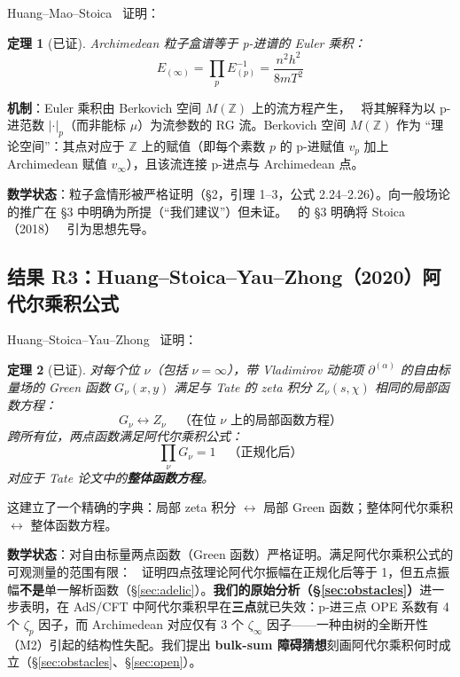 \documentclass[11pt,a4paper]{ctexart}
\newtheorem{theorem}{定理}[section]
\theoremstyle{remark}
\newcommand{\dpartial}{\partial^{(\alpha)}}
\begin{document}
Huang--Mao--Stoica~\cite{HMS20} 证明：

\begin{theorem}[已证]
Archimedean 粒子盒谱等于 p-进谱的 Euler 乘积：
\begin{equation}
E_{(\infty)} = \prod_p E_{(p)}^{-1} = \frac{n^2 h^2}{8 m T^2}
\end{equation}
\end{theorem}

\textbf{机制}：Euler 乘积由 Berkovich 空间 $M(\mathbb{Z})$ 上的流方程产生，~\cite{HMS20} 将其解释为以 p-进范数 $|\cdot|_p$（而非能标 $\mu$）为流参数的 RG 流。Berkovich 空间 $M(\mathbb{Z})$ 作为 ``理论空间''：其点对应于 $\mathbb{Z}$ 上的赋值（即每个素数 $p$ 的 p-进赋值 $v_p$ 加上 Archimedean 赋值 $v_\infty$），且该流连接 p-进点与 Archimedean 点。

\textbf{数学状态}：粒子盒情形被严格证明（\S2，引理 1--3，公式 2.24--2.26）。向一般场论的推广在 \S3 中明确为所提（``我们建议''）但未证。~\cite{HMS20} 的 \S3 明确将 Stoica（2018）~\cite{S18} 引为思想先导。

\subsection{结果 R3：Huang--Stoica--Yau--Zhong（2020）阿代尔乘积公式}
\label{sec:adelic-green}

Huang--Stoica--Yau--Zhong~\cite{HSYZ20} 证明：

\begin{theorem}[已证]
对每个位 $\nu$（包括 $\nu = \infty$），带 Vladimirov 动能项 $\dpartial$ 的自由标量场的 Green 函数 $G_\nu(x,y)$ 满足与 Tate 的 zeta 积分 $Z_\nu(s, \chi)$ 相同的局部函数方程：
\begin{equation}
G_\nu \leftrightarrow Z_\nu \quad \text{（在位 } \nu \text{ 上的局部函数方程）}
\end{equation}
跨所有位，两点函数满足阿代尔乘积公式：
\begin{equation}
\prod_\nu G_\nu = 1 \quad \text{（正规化后）}
\end{equation}
对应于 Tate 论文中的\textbf{整体函数方程}。
\end{theorem}

这建立了一个精确的字典：局部 zeta 积分 $\leftrightarrow$ 局部 Green 函数；整体阿代尔乘积 $\leftrightarrow$ 整体函数方程。

\textbf{数学状态}：对自由标量两点函数（Green 函数）严格证明。满足阿代尔乘积公式的可观测量的范围有限：~\cite{J22} 证明四点弦理论阿代尔振幅在正规化后等于 1，但五点振幅\textbf{不是}单一解析函数（\S\ref{sec:adelic}）。\textbf{我们的原始分析（\S\ref{sec:obstacles}）}进一步表明，在 AdS/CFT 中阿代尔乘积早在\textbf{三点}就已失效：p-进三点 OPE 系数有 4 个 $\zeta_p$ 因子，而 Archimedean 对应仅有 3 个 $\zeta_\infty$ 因子——一种由树的全断开性（M2）引起的结构性失配。我们提出 \textbf{bulk-sum 障碍猜想}刻画阿代尔乘积何时成立（\S\ref{sec:obstacles}、\S\ref{sec:open}）。
\end{document}
